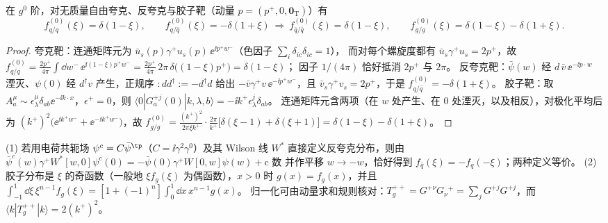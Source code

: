\begin{proposition}[自由场归一化]\tagR\label{prop:cpdf-free}
在 $g^0$ 阶，对无质量自由夸克、反夸克与胶子靶（动量 $p=(p^+,0,\bm 0_{\mathrm T})$）有
\begin{equation}\label{eq:cpdf-free}
f^{(0)}_{q/q}(\xi)=\delta(1-\xi),\qquad
f^{(0)}_{q/\bar q}(\xi)=-\delta(1+\xi)\ \Rightarrow\ f^{(0)}_{\bar q/\bar q}(\xi)=\delta(1-\xi),\qquad
f^{(0)}_{g/g}(\xi)=\delta(1-\xi)-\delta(1+\xi).
\end{equation}
\end{proposition}

\begin{proof}
夸克靶：连通矩阵元为 $\bar u_s(p)\gamma^+u_s(p)\,\ee^{\ii p^+w^-}$（色因子 $\sum_i\delta_{ic}\delta_{ic}=1$），
而对每个螺旋度都有 $\bar u_s\gamma^+u_s=2p^+$，故
$f^{(0)}_{q/q}=\frac{2p^+}{4\pi}\int\dd w^-\,\ee^{\ii(1-\xi)p^+w^-}=\frac{2p^+}{4\pi}\,2\pi\,\delta\big((1-\xi)p^+\big)=\delta(1-\xi)$；
因子 $1/(4\pi)$ 恰好抵消 $2p^+$ 与 $2\pi$。
反夸克靶：$\bar\psi(w)$ 经 $d\,\bar v\,\ee^{-\ii p\cdot w}$ 湮灭、$\psi(0)$ 经 $d^\dagger v$ 产生，正规序 $:\!dd^\dagger\!:=-d^\dagger d$ 给出
$-\bar v\gamma^+v\,\ee^{-\ii p^+w^-}$，且 $\bar v_s\gamma^+v_s=2p^+$，于是 $f^{(0)}_{q/\bar q}=-\delta(1+\xi)$。
胶子靶：取 $A^\mu_a\sim\epsilon^\mu_\lambda\delta_{ab}\ee^{-\ii k\cdot x}$，$\epsilon^+=0$，则 $\langle0|G^{+j}_a(0)|k,\lambda,b\rangle=-\ii k^+\epsilon^j_\lambda\delta_{ab}$。
连通矩阵元含两项（在 $w$ 处产生、在 $0$ 处湮灭，以及相反），对极化平均后为
$(k^+)^2\big(\ee^{\ii k^+w^-}+\ee^{-\ii k^+w^-}\big)$，故
$f^{(0)}_{g/g}=\frac{(k^+)^2}{2\pi\xi k^+}\cdot\frac{2\pi}{k^+}\big[\delta(\xi-1)+\delta(\xi+1)\big]=\delta(1-\xi)-\delta(1+\xi)$。
\end{proof}

\begin{remark}\label{rem:cpdf-conj}
(1) 若用电荷共轭场 $\psi^c=C\bar\psi^{\tp}$（$C=\ii\gamma^2\gamma^0$）及其 Wilson 线 $W^*$ 直接定义反夸克分布，则由
$\bar\psi^c(w)\gamma^+W^*[w,0]\psi^c(0)=-\bar\psi(0)\gamma^+W[0,w]\psi(w)+\text{c 数}$
并作平移 $w\to-w$，恰好得到 $f_{\bar q}(\xi)=-f_q(-\xi)$；两种定义等价。
(2) 胶子分布是 $\xi$ 的奇函数（一般地 $\xi f_g(\xi)$ 为偶函数），$x>0$ 时 $g(x)=f_g(x)$，并且
$\int_{-1}^{1}\dd\xi\,\xi^{n-1}f_g(\xi)=[1+(-1)^n]\int_0^1\dd x\,x^{n-1}g(x)$。
归一化可由动量求和规则核对：$T^{++}_g=G^{+\nu}G_\nu{}^{+}=\sum_jG^{+j}G^{+j}$，而 $\langle k|T^{++}_g|k\rangle=2(k^+)^2$。
\end{remark}

